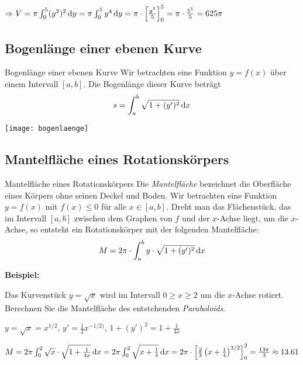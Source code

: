 $\Rightarrow V = \pi \int_{0}^{5} (y^2)^2 \,\mathrm{d}y = \pi \int_{0}^{5} y^4 \,\mathrm{d}y = \pi \cdot \left[ \frac{y^5}{5} \right]_{0}^{5} = \pi \cdot \frac{5^5}{5} = 625 \pi$

\subsection{Bogenlänge einer ebenen Kurve}\label{subsec:bogenlange-einer-ebenen-kurve}

\begin{definition}{Bogenlänge einer ebenen Kurve}
    Wir betrachten eine Funktion $y = f(x)$ über einem Intervall $[a,b]$.
    Die Bogenlänge dieser Kurve beträgt \[s = \int_{a}^{b} \sqrt {1 + (y')^2} \,\mathrm{d}x\]
\end{definition}

\begin{center}
    \texttt{[image: bogenlaenge]}
\end{center}

\newpage

\subsection{Mantelfläche eines Rotationskörpers}\label{subsec:mantelflache-eines-rotationskorpers}

\begin{definition}{Mantelfläche eines Rotationskörpers}
    Die \emph{Mantelfläche} bezeichnet die Oberfläche eines Körpers ohne seinen Deckel und Boden.
    Wir betrachten eine Funktion $y = f(x)$ mit $f(x) \leq 0$ für alle $x \in [a,b]$.
    Dreht man das Flächenstück, das im Intervall $[a,b]$ zwischen dem Graphen von $f$ und der $x$-Achse liegt, um die $x$-Achse, so entsteht ein Rotationskörper mit der folgenden Mantelfläche: \[M = 2 \pi \cdot \int_{a}^{b} y \cdot \sqrt {1 + (y')^2} \,\mathrm{d}x\]
\end{definition}

\textbf{Beispiel:}

Das Kurvenstück $y = \sqrt{x}$ wird im Intervall $0 \geq x \geq 2$ um die $x$-Achse rotiert.
Berechnen Sie die Mantelfläche des entstehenden \emph{Paraboloids}.

$y = \sqrt{x} = x^{1/2}$, $y' = \frac{1}{2} x^{-1/2)}$, $1 + (y')^2 = 1 + \frac{1}{4x}$

$M = 2 \pi \int_{0}^{2} \sqrt{x} \cdot \sqrt {1 + \frac{1}{4x}} \,\mathrm{d}x = 2 \pi \int_{0}^{2} \sqrt {x + \frac{1}{4}} \,\mathrm{d}x = 2 \pi \cdot \left[ \frac{2}{3} \left( x + \frac{1}{4} \right)^{3/2} \right]_{0}^{2} = \frac{13 \pi}{3} \approx 13.61$

